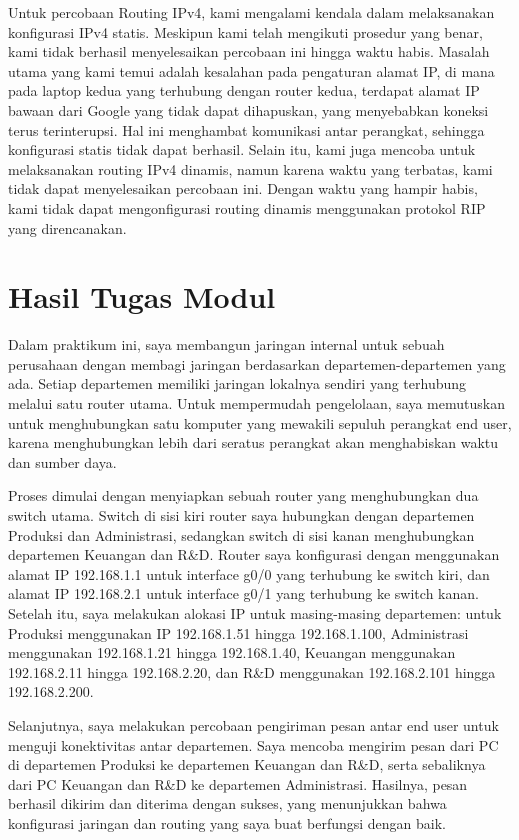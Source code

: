 Untuk percobaan Routing IPv4, kami mengalami kendala dalam melaksanakan konfigurasi IPv4 statis. Meskipun kami telah mengikuti prosedur yang benar, kami tidak berhasil menyelesaikan percobaan ini hingga waktu habis. Masalah utama yang kami temui adalah kesalahan pada pengaturan alamat IP, di mana pada laptop kedua yang terhubung dengan router kedua, terdapat alamat IP bawaan dari Google yang tidak dapat dihapuskan, yang menyebabkan koneksi terus terinterupsi. Hal ini menghambat komunikasi antar perangkat, sehingga konfigurasi statis tidak dapat berhasil. Selain itu, kami juga mencoba untuk melaksanakan routing IPv4 dinamis, namun karena waktu yang terbatas, kami tidak dapat menyelesaikan percobaan ini. Dengan waktu yang hampir habis, kami tidak dapat mengonfigurasi routing dinamis menggunakan protokol RIP yang direncanakan.

\newpage
\section{Hasil Tugas Modul}
Dalam praktikum ini, saya membangun jaringan internal untuk sebuah perusahaan dengan membagi jaringan berdasarkan departemen-departemen yang ada. Setiap departemen memiliki jaringan lokalnya sendiri yang terhubung melalui satu router utama. Untuk mempermudah pengelolaan, saya memutuskan untuk menghubungkan satu komputer yang mewakili sepuluh perangkat end user, karena menghubungkan lebih dari seratus perangkat akan menghabiskan waktu dan sumber daya.

Proses dimulai dengan menyiapkan sebuah router yang menghubungkan dua switch utama. Switch di sisi kiri router saya hubungkan dengan departemen Produksi dan Administrasi, sedangkan switch di sisi kanan menghubungkan departemen Keuangan dan R\&D. Router saya konfigurasi dengan menggunakan alamat IP 192.168.1.1 untuk interface g0/0 yang terhubung ke switch kiri, dan alamat IP 192.168.2.1 untuk interface g0/1 yang terhubung ke switch kanan. Setelah itu, saya melakukan alokasi IP untuk masing-masing departemen:
untuk Produksi menggunakan IP 192.168.1.51 hingga 192.168.1.100, Administrasi menggunakan 192.168.1.21 hingga 192.168.1.40, Keuangan menggunakan 192.168.2.11 hingga 192.168.2.20, dan R\&D menggunakan 192.168.2.101 hingga 192.168.2.200.

Selanjutnya, saya melakukan percobaan pengiriman pesan antar end user untuk menguji konektivitas antar departemen. Saya mencoba mengirim pesan dari PC di departemen Produksi ke departemen Keuangan dan R\&D, serta sebaliknya dari PC Keuangan dan R\&D ke departemen Administrasi. Hasilnya, pesan berhasil dikirim dan diterima dengan sukses, yang menunjukkan bahwa konfigurasi jaringan dan routing yang saya buat berfungsi dengan baik.

